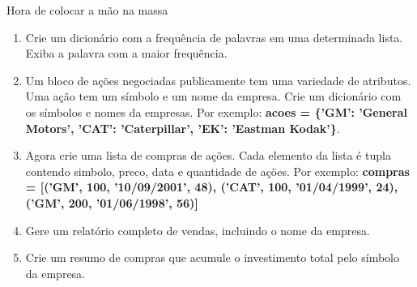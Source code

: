 \begin{frame}{Hora de colocar a mão na massa}
  \begin{enumerate}
    \item Crie um dicionário com a frequência de palavras em uma determinada lista. Exiba a palavra com a maior frequência.
    \item Um bloco de ações negociadas publicamente tem uma variedade de atributos. Uma ação tem um símbolo e um nome da empresa. Crie um dicionário com os símbolos e nomes da empresas. Por exemplo: {\bf acoes = \{'GM': 'General Motors', 'CAT': 'Caterpillar', 'EK': 'Eastman Kodak'\}}. 
    \item Agora crie uma lista de compras de ações. Cada elemento da lista é tupla contendo simbolo, preco, data e quantidade de ações. Por exemplo: {\bf compras = [('GM', 100, '10/09/2001', 48), ('CAT', 100, '01/04/1999', 24), ('GM', 200, '01/06/1998', 56)]}
    \item Gere um relatório completo de vendas, incluindo o nome da empresa.
    \item Crie um resumo de compras que acumule o investimento total pelo símbolo da empresa.
  \end{enumerate}
\end{frame}